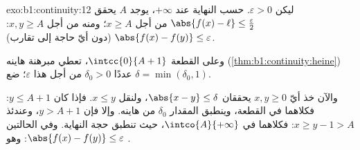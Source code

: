 \begin{solution}{exo:b1:continuity:12}
ليكن $\varepsilon > 0$. حسب النهاية عند $+\infty$، يوجد $A$ يحقق
$\abs{f(x) - \ell} \leq \frac\varepsilon2$ من أجل $x \geq A$؛ ومنه من أجل
$x, y \geq A$: $\abs{f(x) - f(y)} \leq \varepsilon$ (دون أيّ حاجة
إلى تقارب).

وعلى القطعة $\intcc{0}{A + 1}$، تعطي مبرهنة هاينه
(\cref{thm:b1:continuity:heine}) عددًا $\delta_0 > 0$ من أجل هذا
$\varepsilon$؛ ضع $\delta = \min(\delta_0, 1)$.

والآن خذ أيّ $x, y \geq 0$ يحققان $\abs{x - y} \leq \delta$، ولنقل $x
\leq y$. فإذا كان $y \leq A + 1$: فكلاهما في القطعة، وينطبق
المقدار $\delta_0$ من هاينه. وإلا فإن $y > A + 1$، وعندئذ $x \geq y - 1 >
A$: فكلاهما في $\intco{A}{+\infty}$، حيث تنطبق حجة
النهاية. وفي الحالتين $\abs{f(x) - f(y)} \leq \varepsilon$: وهو .
\end{solution}

